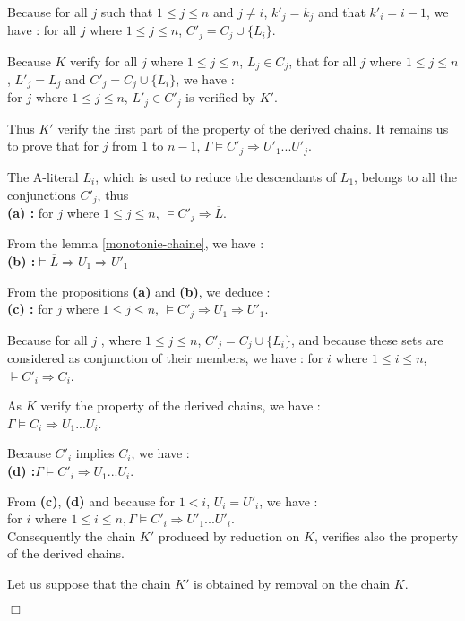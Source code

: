 \documentclass{article}
\newenvironment{preuve}{\noindent {\em Proof :}\ }{{\hfill
    $\Box$}\vspace{.5pc}} \newcommand{\sg}{\!\!<\!\!}
\begin{document}
\begin{preuve}
\begin{itemrond}
Because for all $j$ such that $1 \leq j \leq n$ and $j \not= i$, $k'_j = k_j$ and that $k'_i = i-1$, we have :
 for all $j$ where $1 \leq j \leq n$, $C'_j = C_j \cup \{ L_i\}$.

Because $K$ verify for all $j$ where $1 \leq j \leq n$, $L_j \in C_j$, that for all $j$ where $1 \leq j \leq n$, 
$L'_j = L_j$
and $C'_j = C_j \cup \{L_i\}$, we have :\\
for $j$ where $1 \leq j \leq n$, $L'_j \in C'_j$ is verified by $K'$.

Thus $K'$ verify the first part of the property of the derived chains. It remains us to prove that
for $j$ from $1$ to $n-1$, $\Gamma \models C'_j \Rightarrow U'_1...U'_j$.


The A-literal $L_i$, which is used to reduce the descendants of $L_1$, belongs to all the 
conjunctions $C'_j$, thus \\
\textbf{ (a) : }for $j$ where $1 \leq j \leq n$, $\models C'_j \Rightarrow \overline{L}$.

From the lemma \ref{monotonie-chaine}, we have :\\
\textbf{ (b) :}$\models \overline{L} \Rightarrow U_1 \Rightarrow U'_1$ 

From the propositions \textbf{(a)} and \textbf{(b)}, we deduce :\\
\textbf{ (c) :} for $j$ where  $1 \leq j \leq n$, $\models C'_j \Rightarrow U_1 \Rightarrow U'_1$.

Because for all $j$ , where $1 \leq j \leq n$, $C'_j = C_j \cup \{L_i\}$, and because these sets are considered as 
conjunction of their members, we have :
for $i$ where $1 \leq i \leq n$, $\models C'_i \Rightarrow C_i$.

As $K$ verify the property of the derived chains, we have  : \\$\Gamma \models C_i \Rightarrow U_1...U_i$.

Because $C'_i$ implies $C_i$, we have : \\
\textbf{ (d) :}$\Gamma \models C'_i \Rightarrow U_1...U_i$.

From \textbf{(c)}, \textbf{(d)} and because for $1 < i$, $U_i = U'_i$, we have :\\
for $i$ where $1 \leq i \leq n, \Gamma \models C'_i \Rightarrow U'_1...U'_i$.\\
Consequently the chain $K'$ produced by reduction on $K$, verifies also the property of the derived chains.

\item Let us suppose that the chain $K'$ is obtained by removal on the chain $K$.


\end{itemrond}
\end{preuve}
\end{document}
